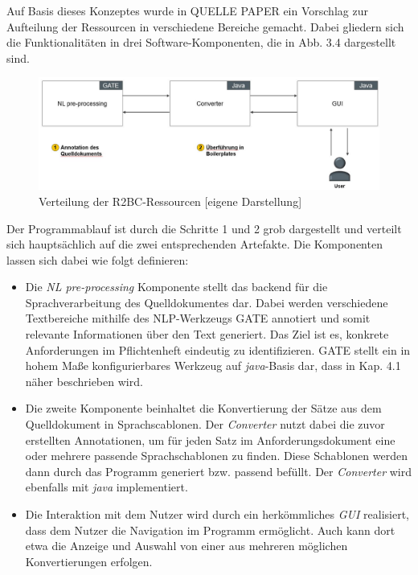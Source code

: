 \documentclass[12pt]{report}
\begin{document}
Auf Basis dieses Konzeptes wurde in QUELLE PAPER ein Vorschlag zur Aufteilung der Ressourcen in verschiedene Bereiche gemacht. Dabei gliedern sich die Funktionalitäten in drei Software-Komponenten, die in Abb. 3.4 dargestellt sind.
\begin{figure}[h!]
\begin{center}
\includegraphics[scale=0.5]{Bilder/Verteilung-R2BC.jpg}
\caption{Verteilung der R2BC-Ressourcen [eigene Darstellung]}
\end{center}
\end{figure}
Der Programmablauf ist durch die Schritte 1 und 2 grob dargestellt und verteilt sich hauptsächlich auf die zwei entsprechenden Artefakte. Die Komponenten lassen sich dabei wie folgt definieren:
\begin{itemize}
\item Die \textit{NL pre-processing} Komponente stellt das backend für die Sprachverarbeitung des Quelldokumentes dar. Dabei werden verschiedene Textbereiche mithilfe des NLP-Werkzeugs GATE annotiert und somit relevante Informationen über den Text generiert. Das Ziel ist es, konkrete Anforderungen im Pflichtenheft eindeutig zu identifizieren. GATE stellt ein in hohem Maße konfigurierbares Werkzeug auf \textit{java}-Basis dar, dass in Kap. 4.1 näher beschrieben wird.
\item Die zweite Komponente beinhaltet die Konvertierung der Sätze aus dem Quelldokument in Sprachscablonen. Der \textit{Converter} nutzt dabei die zuvor erstellten Annotationen, um für jeden Satz im Anforderungsdokument eine oder mehrere passende Sprachschablonen zu finden. Diese Schablonen werden dann durch das Programm generiert bzw. passend \glqq befüllt\grqq{}. Der \textit{Converter} wird ebenfalls mit \textit{java} implementiert.
\item Die Interaktion mit dem Nutzer wird durch ein herkömmliches \textit{GUI} realisiert, dass dem Nutzer die Navigation im Programm ermöglicht. Auch kann dort etwa die Anzeige und Auswahl von einer aus mehreren möglichen Konvertierungen erfolgen.
\end{itemize}
\end{document}
